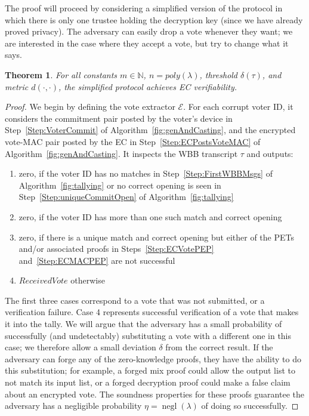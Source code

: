 \documentclass[12pt,a4paper]{article}
\DeclareMathOperator{\negl}{\text{negl}}
\newtheorem{theorem}{Theorem}
\theoremstyle{definition}
\newcommand{\ReceivedVote}{\mathit{ReceivedVote}}
\begin{document}
The proof will proceed by considering a simplified version of the protocol in which there is only one trustee holding the decryption key (since we have already proved privacy). The adversary can easily drop a vote whenever they want; we are interested in the case where they accept a vote, but try to change what it says.

\begin{theorem}
    For all constants $m\in\mathbb{N}$, $n=poly(\lambda)$, threshold $\delta(\tau)$, and metric $d(\cdot, \cdot)$, the simplified protocol achieves EC verifiability.
\end{theorem}
\begin{proof}
    We begin by defining the vote extractor $\mathcal{E}$. For each corrupt voter ID, it considers the commitment pair posted by the voter's device in Step~\ref{Step:VoterCommit} of Algorithm~\ref{fig:genAndCasting}, and the encrypted vote-MAC pair posted by the EC in Step~\ref{Step:ECPostsVoteMAC} of Algorithm~\ref{fig:genAndCasting}. It inspects the WBB transcript $\tau$ and outputs:
    \begin{enumerate}
        \item zero, if the voter ID has no matches in Step~\ref{Step:FirstWBBMsgs} of Algorithm~\ref{fig:tallying} or no correct opening is seen in Step~\ref{Step:uniqueCommitOpen} of Algorithm~\ref{fig:tallying}
        \item zero, if the voter ID has more than one such match and correct opening
        \item zero, if there is a unique match and correct opening but either of the PETs and/or associated proofs in Steps~\ref{Step:ECVotePEP} and~\ref{Step:ECMACPEP} are not successful
        \item $\ReceivedVote$ otherwise
    \end{enumerate}

    The first three cases correspond to a vote that was not submitted, or a verification failure. Case 4 represents successful verification of a vote that makes it into the tally. We will argue that the adversary has a small probability of successfully (and undetectably) substituting a vote with a different one in this case; we therefore allow a small deviation $\delta$ from the correct result. If the adversary can forge any of the zero-knowledge proofs, they have the ability to do this substitution; for example, a forged mix proof could allow the output list to not match its input list, or a forged decryption proof could make a false claim about an encrypted vote. The soundness properties for these proofs guarantee the adversary has a negligible probability $\eta=\negl(\lambda)$ of doing so successfully.


\end{proof}
\end{document}
